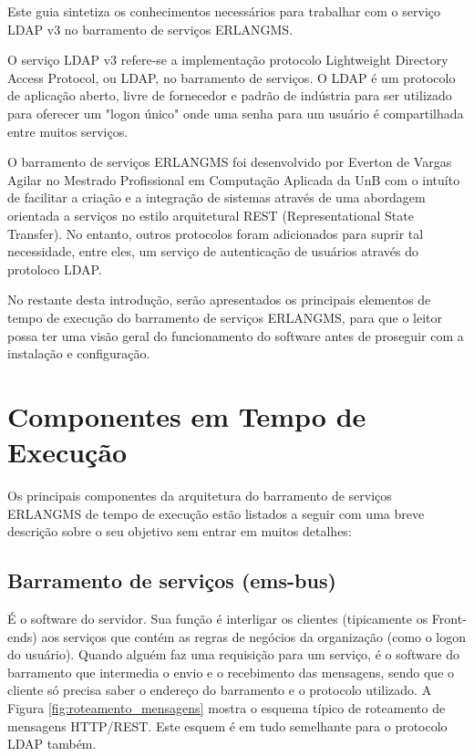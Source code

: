 Este guia sintetiza os conhecimentos necessários para trabalhar
com o serviço LDAP v3 no barramento de serviços ERLANGMS.

O serviço LDAP v3 refere-se a implementação protocolo
Lightweight Directory Access Protocol, ou LDAP, no barramento de serviços.
O LDAP é um protocolo de aplicação aberto, livre de fornecedor e 
padrão de indústria para ser utilizado para oferecer
um "logon único" onde uma senha para um usuário é compartilhada entre muitos serviços.

O barramento de serviços ERLANGMS foi desenvolvido por Everton de Vargas Agilar
no Mestrado Profissional em Computação Aplicada da UnB com 
o intuíto de facilitar a criação e a integração de sistemas 
através de uma abordagem orientada a serviços no estilo 
arquitetural REST (Representational State Transfer). 
No entanto, outros protocolos foram adicionados para suprir tal necessidade,
entre eles, um serviço de autenticação de usuários através do protoloco LDAP.

No restante desta introdução, serão apresentados os principais 
elementos de tempo de execução do barramento de serviços ERLANGMS, 
para que o leitor possa ter uma visão geral do funcionamento
do software antes de proseguir com a instalação e configuração.


\section{Componentes em Tempo de Execução}

Os principais componentes da arquitetura do barramento de serviços 
ERLANGMS de tempo de execução 
estão listados a seguir com uma breve descrição sobre o seu objetivo
sem entrar em muitos detalhes:


\subsection{Barramento de serviços (ems-bus)}

É o software do servidor. Sua função é interligar os clientes (tipicamente os Front-ends) 
aos serviços que contém as regras de negócios da organização (como o logon do usuário). 
Quando alguém faz uma requisição para um serviço, é o software do barramento 
que intermedia o envio e o recebimento das mensagens, sendo que o cliente
só precisa saber o endereço do barramento e o protocolo utilizado. A 
Figura \ref{fig:roteamento_mensagens} mostra o esquema típico de
roteamento de mensagens HTTP/REST. Este esquem é em tudo semelhante
para o protocolo LDAP também.

